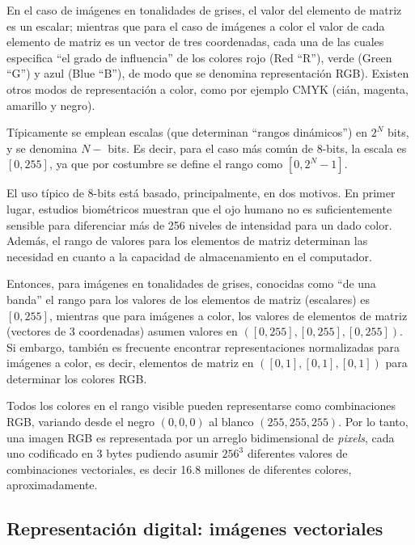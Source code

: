 %
En el caso de im\'agenes en tonalidades de grises, el valor del elemento de matriz es un escalar; mientras que para el caso de im\'agenes a color el 
valor de cada elemento de matriz es un vector de tres coordenadas, cada una de las cuales especifica ``el grado de influencia'' de los colores rojo 
(Red ``R''), verde (Green ``G'') y azul (Blue ``B''), de modo que se denomina representaci\'on RGB). 
%
Existen otros modos de representaci\'on a color, como por ejemplo CMYK (ci\'an, magenta, amarillo y negro). 
%

%
T\'ipicamente se emplean escalas (que determinan ``rangos din\'amicos'') en $2^{N}$ bits, y se denomina $N-$ bits. Es decir, para el caso m\'as com\'un de 
8-bits, la escala es $[0, 255]$, ya que por costumbre se define el rango como $[0, 2^{N} - 1]$. 
%

%
El uso t\'ipico de 8-bits est\'a basado, principalmente, en dos motivos. En primer lugar, estudios biom\'etricos muestran que el ojo humano no
es suficientemente sensible para diferenciar m\'as de 256 niveles de intensidad para un dado color. Adem\'as, el rango de valores para los 
elementos de matriz determinan las necesidad en cuanto a la capacidad de almacenamiento en el computador.
%

%
Entonces, para im\'agenes en tonalidades de grises, conocidas
como ``de una banda'' el rango para los valores de los elementos de matriz (escalares) es $[0, 255]$, mientras que para im\'agenes a color, los valores de 
elementos de matriz (vectores de 3 coordenadas) asumen valores en $([0, 255], [0, 255], [0, 255])$.
%
Si embargo, tambi\'en es frecuente encontrar representaciones 
normalizadas para im\'agenes a color, es decir, elementos de matriz en $([0, 1], [0, 1], [0, 1])$ para determinar los colores RGB.
%

%
Todos los colores en el rango visible pueden representarse como combinaciones RGB, variando desde el negro $(0, 0, 0)$ al blanco $(255, 255, 255)$.
%
Por lo tanto, una imagen RGB es representada por un arreglo bidimensional de \textit{pixels}, cada uno codificado en 3 bytes pudiendo asumir 
$256^{3}$ diferentes valores de combinaciones vectoriales, es decir 16.8 millones de diferentes colores, aproximadamente.
%

\subsection{Representaci\'on digital: im\'agenes vectoriales}

